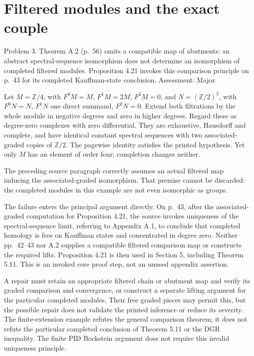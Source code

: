 \documentclass[10pt]{article}
\begin{document}
\section*{Filtered modules and the exact couple}
Problem 3.  Theorem A.2 (p. 56) omits a compatible map of abutments: an abstract spectral-sequence isomorphism does not determine an isomorphism of completed filtered modules. Proposition 4.21 invokes this comparison principle on p. 43 for its completed Kauffman-state conclusion. Assessment: Major.\par
Let \(M=\mathbb Z/4\), with \(F^0M=M\), \(F^1M=2M\), \(F^2M=0\), and \(N=(\mathbb Z/2)^2\), with \(F^0N=N\), \(F^1N\) one direct summand, \(F^2N=0\). Extend both filtrations by the whole module in negative degrees and zero in higher degrees. Regard these as degree-zero complexes with zero differential. They are exhaustive, Hausdorff and complete, and have identical constant spectral sequences with two associated-graded copies of \(\mathbb Z/2\). The pagewise identity satisfies the printed hypothesis. Yet only \(M\) has an element of order four; completion changes neither.\par
The preceding source paragraph correctly assumes an actual filtered map inducing the associated-graded isomorphism. That premise cannot be discarded: the completed modules in this example are not even isomorphic as groups.\par
The failure enters the principal argument directly. On p. 43, after the associated-graded computation for Proposition 4.21, the source invokes uniqueness of the spectral-sequence limit, referring to Appendix A.1, to conclude that completed homology is free on Kauffman states and concentrated in degree zero. Neither pp. 42–43 nor A.2 supplies a compatible filtered comparison map or constructs the required lifts. Proposition 4.21 is then used in Section 5, including Theorem 5.11. This is an invoked core proof step, not an unused appendix assertion.\par
A repair must retain an appropriate filtered chain or abutment map and verify its graded comparison and convergence, or construct a separate lifting argument for the particular completed modules. Their free graded pieces may permit this, but the possible repair does not validate the printed inference or reduce its severity. The finite-extension example refutes the general comparison theorem; it does not refute the particular completed conclusion of Theorem 5.11 or the DGR inequality. The finite PID Bockstein argument does not require this invalid uniqueness principle.\par
\end{document}
